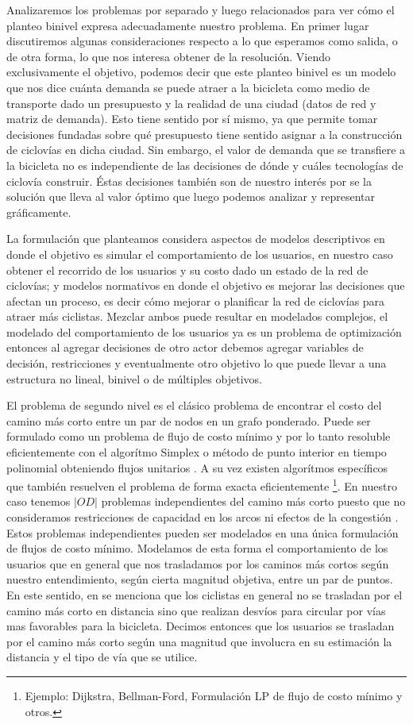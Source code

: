 Analizaremos los problemas por separado y luego relacionados para ver cómo el planteo binivel expresa adecuadamente nuestro problema. En primer lugar discutiremos algunas consideraciones respecto a lo que esperamos como salida, o de otra forma, lo que nos interesa obtener de la resolución. Viendo exclusivamente el objetivo, podemos decir que este planteo binivel es un modelo que nos dice cuánta demanda se puede atraer a la bicicleta como medio de transporte dado un presupuesto y la realidad de una ciudad (datos de red y matriz de demanda). Esto tiene sentido por sí mismo, ya que permite tomar decisiones fundadas sobre qué presupuesto tiene sentido asignar a la construcción de ciclovías en dicha ciudad. Sin embargo, el valor de demanda que se transfiere a la bicicleta no es independiente de las decisiones de dónde y cuáles tecnologías de ciclovía construir. Éstas decisiones también son de nuestro interés por se la solución que lleva al valor óptimo que luego podemos analizar y representar gráficamente.

La formulación que planteamos considera aspectos de modelos descriptivos en donde el objetivo es simular el comportamiento de los usuarios, en nuestro caso obtener el recorrido de los usuarios y su costo dado un estado de la red de ciclovías; y modelos normativos en donde el objetivo es mejorar las decisiones que afectan un proceso, es decir cómo mejorar o planificar la red de ciclovías para atraer más ciclistas. Mezclar ambos puede resultar en modelados complejos, el modelado del comportamiento de los usuarios ya es un problema de optimización entonces al agregar decisiones de otro actor debemos agregar variables de decisión, restricciones y eventualmente otro objetivo lo que puede llevar a una estructura no lineal, binivel o de múltiples objetivos.

El problema de segundo nivel es el clásico problema de encontrar el costo del camino más corto entre un par de nodos en un grafo ponderado. Puede ser formulado como un problema de flujo de costo mínimo y por lo tanto resoluble eficientemente con el algorítmo Simplex o método de punto interior en tiempo polinomial obteniendo flujos unitarios \citep{networkflowsbook}. A su vez existen algorítmos específicos que también resuelven el problema de forma exacta eficientemente \footnote{Ejemplo: Dijkstra, Bellman-Ford, Formulación LP de flujo de costo mínimo y otros.}. En nuestro caso tenemos $|OD|$ problemas independientes del camino más corto puesto que no consideramos restricciones de capacidad en los arcos ni efectos de la congestión \citep{Sheffi1985}. Estos problemas independientes pueden ser modelados en una única formulación de flujos de costo mínimo. Modelamos de esta forma el comportamiento de los usuarios que en general que nos trasladamos por los caminos más cortos según nuestro entendimiento, según cierta magnitud objetiva, entre un par de puntos. En este sentido, en \cite{winters2010} se menciona que los ciclistas en general no se trasladan por el camino más corto en distancia sino que realizan desvíos para circular por vías mas favorables para la bicicleta. Decimos entonces que los usuarios se trasladan por el camino más corto según una magnitud que involucra en su estimación la distancia y el tipo de vía que se utilice.

